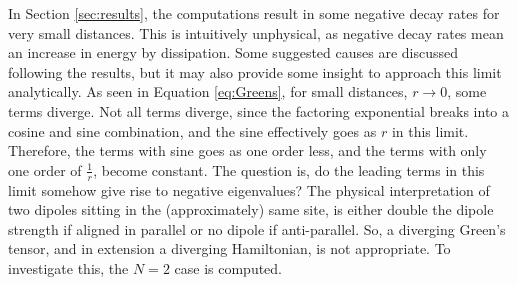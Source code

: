 \documentclass{article}
\begin{document}
\noindent
In Section \ref{sec:results}, the computations result in some negative decay rates for very small distances. This is intuitively unphysical, as negative decay rates mean an increase in energy by dissipation. Some suggested causes are discussed following the results, but it may also provide some insight to approach this limit analytically. As seen in Equation \ref{eq:Greens}, for small distances, $r \rightarrow 0$, some terms diverge. Not all terms diverge, since the factoring exponential breaks into a cosine and sine combination, and the sine effectively goes as $r$ in this limit. Therefore, the terms with sine goes as one order less, and the terms with only one order of $\frac{1}{r}$, become constant. The question is, do the leading terms in this limit somehow give rise to negative eigenvalues? The physical interpretation of two dipoles sitting in the (approximately) same site, is either double the dipole strength if aligned in parallel or no dipole if anti-parallel. So, a diverging Green's tensor, and in extension a diverging Hamiltonian, is not appropriate. To investigate this, the $N=2$ case is computed.
\end{document}
